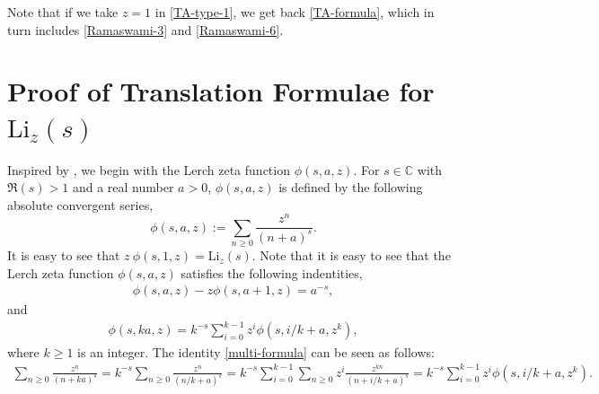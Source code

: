 \documentclass[12pt]{amsart}
\newcommand{\C}{{\mathbb C}}
\newtheorem{rmk}{Remark}
\newcommand{\thmref}[1]{Theorem~\ref{#1}}
\newcommand{\rmkref}[1]{Remark~\ref{#1}}
\begin{document}
Note that if we take $z=1$ in \eqref{TA-type-1}, we get back \eqref{TA-formula}, which in turn includes
\eqref{Ramaswami-3} and \eqref{Ramaswami-6}.  

%
%


\section{Proof of  Translation Formulae for $\mathrm{Li}_{z}(s)$}

Inspired by \cite{TA}, we begin with the Lerch zeta function 
$\phi(s,a,z)$. For $s\in \C$ with $\Re(s)>1$ and a real number $a>0$, $\phi(s,a,z)$ is defined by the following absolute convergent series,
\begin{equation}\label{Lerch}
\phi(s,a,z):=\sum_{n\ge 0}\frac{z^n}{(n+a)^s}.
\end{equation}
It is easy to see that $z \ \phi(s,1,z)=\mathrm{Li}_z(s)$.
Note that it is easy to see that
the Lerch zeta function $\phi(s,a,z)$ satisfies the following indentities,
\begin{align}\label{trans-phi}
\phi(s,a,z)-z\phi(s,a+1,z)=a^{-s},
\end{align}
and 
\begin{align}\label{multi-formula}
\phi(s,ka,z)=k^{-s}\sum_{i=0}^{k-1}z^i\phi(s,i/k+a,z^k),
\end{align}
where $k\geq 1$ is an integer. The identity \eqref{multi-formula} can be seen as follows:
\begin{align*}
\sum_{n\ge 0}\frac{z^n}{(n+ka)^s}=k^{-s}\sum_{n\ge 0}\frac{z^n}{(n/k+a)^s}=k^{-s}\sum_{i=0}^{k-1}
\sum_{n\ge 0}z^i\frac{z^{kn}}{(n+i/k+a)^s}=k^{-s}\sum_{i=0}^{k-1}z^i\phi(s,i/k+a,z^k).
\end{align*}
\end{document}
